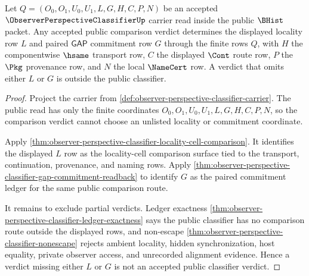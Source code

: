 \begin{theorem}
\label{thm:observer-perspective-classifier-locality-commitment-inversion}
Let $Q=(O_0,O_1,U_0,U_1,L,G,H,C,P,N)$ be an accepted $\ObserverPerspectiveClassifierUp$ carrier read inside the public $\BHist$ packet. Any accepted public comparison verdict determines the displayed locality row $L$ and paired $\mathsf{GAP}$ commitment row $G$ through the finite rows $Q$, with $H$ the componentwise $\hsame$ transport row, $C$ the displayed $\Cont$ route row, $P$ the $\Pkg$ provenance row, and $N$ the local $\NameCert$ row. A verdict that omits either $L$ or $G$ is outside the public classifier.
\end{theorem}
\begin{proof}
Project the carrier from \autoref{def:observer-perspective-classifier-carrier}. The public read has only the finite coordinates $O_0,O_1,U_0,U_1,L,G,H,C,P,N$, so the comparison verdict cannot choose an unlisted locality or commitment coordinate.

Apply \autoref{thm:observer-perspective-classifier-locality-cell-comparison}. It identifies the displayed $L$ row as the locality-cell comparison surface tied to the transport, continuation, provenance, and naming rows. Apply \autoref{thm:observer-perspective-classifier-gap-commitment-readback} to identify $G$ as the paired commitment ledger for the same public comparison route.

It remains to exclude partial verdicts. Ledger exactness \autoref{thm:observer-perspective-classifier-ledger-exactness} says the public classifier has no comparison route outside the displayed rows, and non-escape \autoref{thm:observer-perspective-classifier-nonescape} rejects ambient locality, hidden synchronization, host equality, private observer access, and unrecorded alignment evidence. Hence a verdict missing either $L$ or $G$ is not an accepted public classifier verdict.
\end{proof}

